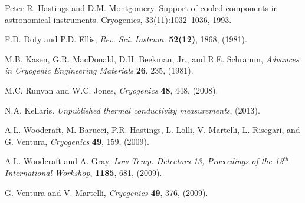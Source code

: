 \documentclass[final]{svjour2}
\begin{document}
\begin{thebibliography}{99}

Peter R. Hastings and D.M. Montgomery. Support of cooled components in astronomical instruments. Cryogenics, 33(11):1032–1036, 1993.


F.D. Doty and P.D. Ellis, {\it Rev. Sci. Instrum.} \textbf{52(12)}, 1868, (1981).

M.B. Kasen, G.R. MacDonald, D.H. Beekman, Jr., and R.E. Schramm, {\it Advances in Cryogenic Engineering Materials} \textbf{26}, 235, (1981). 


M.C. Runyan and W.C. Jones, {\it Cryogenics} \textbf{48}, 448, (2008).

N.A. Kellaris. {\it Unpublished thermal conductivity measurements}, (2013).

A.L. Woodcraft, M. Barucci, P.R. Hastings, L. Lolli, V. Martelli, L. Risegari, and G. Ventura, {\it Cryogenics} \textbf{49}, 159, (2009).

A.L. Woodcraft and A. Gray, {\it Low Temp. Detectors 13, Proceedings of the 13$^{th}$ International Workshop}, \textbf{1185}, 681, (2009).

G. Ventura and V. Martelli, {\it Cryogenics} \textbf{49}, 376, (2009).

\end{thebibliography}
\end{document}
